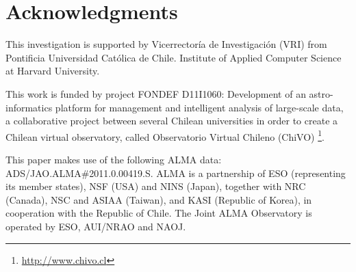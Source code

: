 \section*{Acknowledgments}

This investigation is supported by Vicerrectoría de Investigaci\'on (VRI) from Pontificia Universidad Cat\'olica de Chile.
Institute of Applied Computer Science at Harvard University.

This  work  is  funded  by  project  FONDEF  D11I1060:  Development  of  an  astro-informatics  platform  for management and intelligent analysis of large-scale data, a collaborative project between several Chilean universities in order to create a Chilean virtual observatory, called Observatorio Virtual Chileno (ChiVO)
\footnote{\url{http://www.chivo.cl}}.

This paper makes use of the following ALMA data: ADS/JAO.ALMA\#2011.0.00419.S. ALMA is a partnership of ESO (representing its member states), NSF (USA) and NINS (Japan), together with NRC (Canada), NSC and ASIAA (Taiwan), and KASI (Republic of Korea), in cooperation with the Republic of Chile. The Joint ALMA Observatory is operated by ESO, AUI/NRAO and NAOJ.